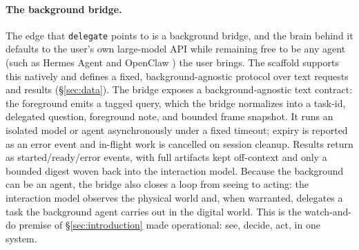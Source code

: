 \documentclass{llmxive}
\providecommand{\todo}[1]{}
\begin{document}


\paragraph{\textbf{The background bridge.}} The edge that \texttt{delegate} points to is a background bridge, and the brain behind it defaults to the user's own large-model API while remaining free to be any agent (such as Hermes Agent \cite{hermesagent} and OpenClaw \cite{openclaw} ) the user brings. The scaffold supports this natively and defines a fixed, background-agnostic protocol over text requests and results (§\ref{sec:data}). The bridge exposes a background-agnostic text contract: the foreground emits a tagged query, which the bridge normalizes into a task-id, delegated question, foreground note, and bounded frame snapshot. It runs an isolated model or agent asynchronously under a fixed timeout; expiry is reported as an error event and in-flight work is cancelled on session cleanup. Results return as started/ready/error events, with full artifacts kept off-context and only a bounded digest woven back into the interaction model. Because the background can be an agent, the bridge also closes a loop from seeing to acting: the interaction model observes the physical world and, when warranted, delegates a task the background agent carries out in the digital world. This is the watch-and-do premise of \S\ref{sec:introduction} made operational: see, decide, act, in one system. 

\end{document}
